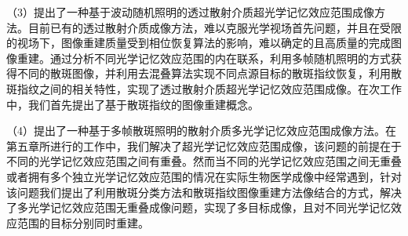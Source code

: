 （3）提出了一种基于波动随机照明的透过散射介质超光学记忆效应范围成像方法。目前已有的透过散射介质成像方法，难以克服光学视场首先问题，并且在受限的视场下，图像重建质量受到相位恢复算法的影响，难以确定的且高质量的完成图像重建。通过分析不同光学记忆效应范围的内在联系，利用多帧随机照明的方式获得不同的散斑图像，并利用去混叠算法实现不同点源目标的散斑指纹恢复，利用散斑指纹之间的相关特性，实现了透过散射介质超光学记忆效应范围成像。在次工作中，我们首先提出了基于散斑指纹的图像重建概念。

（4）提出了一种基于多帧散斑照明的散射介质多光学记忆效应范围成像方法。在第五章所进行的工作中，我们解决了超光学记忆效应范围成像，该问题的前提在于不同的光学记忆效应范围之间有重叠。然而当不同的光学记忆效应范围之间无重叠或者拥有多个独立光学记忆效应范围的情况在实际生物医学成像中经常遇到，针对该问题我们提出了利用散斑分类方法和散斑指纹图像重建方法像结合的方式，解决了多光学记忆效应范围无重叠成像问题，实现了多目标成像，且对不同光学记忆效应范围的目标分别同时重建。
